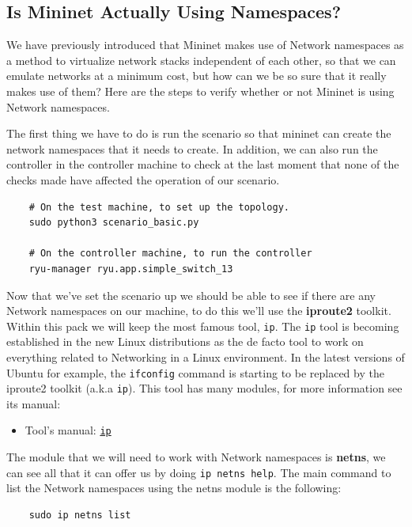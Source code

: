 \documentclass[12pt]{article}
\newcommand{\newpar} {
    \vskip 1cm
}
\begin{document}
	\subsection{Is Mininet Actually Using Namespaces?}
		We have previously introduced that Mininet makes use of Network namespaces as a method to virtualize network stacks independent of each other, so that we can emulate networks at a minimum cost, but how can we be so sure that it really makes use of them? Here are the steps to verify whether or not Mininet is using Network namespaces.
		\newpar
		The first thing we have to do is run the scenario so that mininet can create the network namespaces that it needs to create. In addition, we can also run the controller in the controller machine to check at the last moment that none of the checks made have affected the operation of our scenario.

		\begin{verbatim}
	# On the test machine, to set up the topology.
	sudo python3 scenario_basic.py

	# On the controller machine, to run the controller
	ryu-manager ryu.app.simple_switch_13
		\end{verbatim}

		Now that we've set the scenario up we should be able to see if there are any Network namespaces on our machine, to do this we'll use the \textbf{iproute2} toolkit. Within this pack we will keep the most famous tool, \texttt{ip}. The \texttt{ip} tool is becoming established in the new Linux distributions as the de facto tool to work on everything related to Networking in a Linux environment. In the latest versions of Ubuntu for example, the \texttt{ifconfig} command is starting to be replaced by the iproute2 toolkit (a.k.a \texttt{ip}). This tool has many modules, for more information see its manual:

		\begin{itemize}
			\item Tool's manual: \href{https://linux.die.net/man/8/ip}{\texttt{ip}}
		\end{itemize}

		The module that we will need to work with Network namespaces is \textbf{netns}, we can see all that it can offer us by doing \texttt{ip netns help}. The main command to list the Network namespaces using the netns module is the following:

		\begin{verbatim}
	sudo ip netns list
		\end{verbatim}
\end{document}
